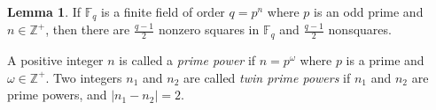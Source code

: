 \documentclass[12pt]{article}
\theoremstyle{definition}
\newtheorem{lemma}[theorem]{Lemma}
\begin{document}

\begin{lemma}\label{lem: finite fields result}
    If $\mathbb{F}_q$ is a finite field of order $q = p^n$ where $p$ is an odd prime and $n\in \mathbb{Z}^+$, then there are $\frac{q-1}{2}$ nonzero squares in $\mathbb{F}_q$ and $\frac{q-1}{2}$ nonsquares. 
\end{lemma}

A positive integer $n$ is called a \emph{prime power} if $n = p^\omega$ where $p$ is a prime and $\omega \in \mathbb{Z}^+$. Two integers $n_1$ and $n_2$ are called \emph{twin prime powers} if $n_1$ and $n_2$ are prime powers, and $|n_1 - n_2| = 2$.
\end{document}
